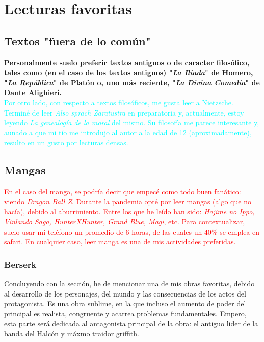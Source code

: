 \documentclass[letterpaper, 12pt]{article}
\begin{document}
\newpage
{\section{\Large{Lecturas favoritas}}
  \subsection{\large{Textos "fuera de lo com\'un"}}
  \textbf{Personalmente suelo preferir textos antiguos o de caracter filos\'ofico, tales como (en el caso de los textos antiguos) "\textit{La Iliada}" de Homero, "\textit{La Rep\'ublica}" de Plat\'on o, uno m\'as reciente, "\textit{La Divina Comedia}" de Dante Alighieri.}\\

  \textcolor{cyan}{Por otro lado, con respecto a textos filos\'oficos, me gusta leer a Nietzsche. Termin\'e de leer \textsl{Also sprach Zaratustra} en preparatoria y, actualmente, estoy leyendo \textit{La genealog\'ia de la moral} del mismo. Su filosof\'ia me parece interesante y, aunado a que mi t\'io me introdujo al autor a la edad de 12 (aproximadamente), resulto en un gusto por lecturas densas.}
  
  \subsection{\large{Mangas}}
  \textcolor{red}{En el caso del manga, se podr\'ia decir que empec\'e como todo buen fan\'atico: viendo \textit{Dragon Ball Z}. Durante la pandemia opt\'e por leer mangas (algo que no hac\'ia), debido al aburrimiento. Entre los que he le\'ido han sido: \textit{Hajime no Ippo, Vinlando Saga, HunterXHunter, Grand Blue, Magi}, etc. Para contextualizar, suelo usar mi tel\'efono un promedio de 6 horas, de las cuales un 40\% se emplea en safari. En cualquier caso, leer manga es una de mis actividades preferidas.}

  
  \subsubsection{\large{Berserk}}
  Concluyendo con la secci\'on, he de mencionar una de mis obras favoritas, debido al desarrollo de los personajes, del mundo y las consecuencias de los actos del protagonista. Es una obra sublime, en la que incluso el aumento de poder del principal es realista, congruente y acarrea problemas fundamentales. Empero, esta parte ser\'a dedicada al antagonista principal de la obra: el antiguo lider de la banda del Halc\'on y m\'axmo traidor griffith.\\

}
\end{document}
